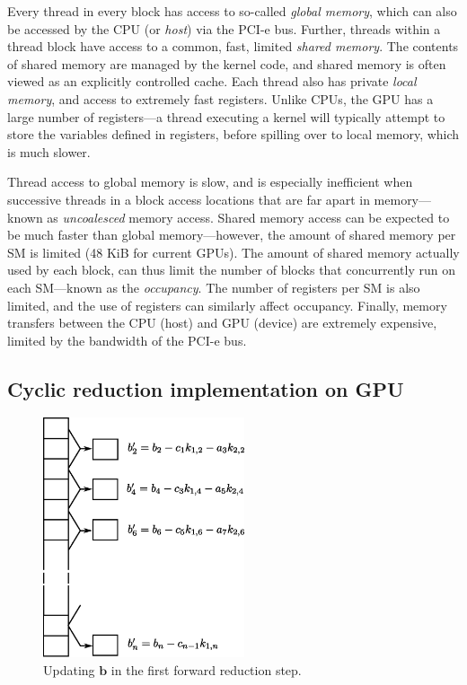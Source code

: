 \documentclass{elsarticle}
\begin{document}
Every thread in every block has access to so-called \emph{global memory},
which can also be accessed by the CPU (or \emph{host}) via the PCI-e bus.
Further,
threads within a thread block have access
to a common, fast, limited \emph{shared memory}.
The contents of shared memory are managed by the kernel code,
and shared memory is often viewed as an explicitly controlled cache.
Each thread also has private \emph{local memory},
and access to extremely fast registers.
Unlike CPUs, the GPU has a large number of registers---a
thread executing a kernel will
typically attempt to store the variables defined in registers,
before spilling over to local memory, which is much slower.

Thread access to global memory is slow,
and is especially inefficient when
successive threads in a block
access locations that are far apart in memory---known
as \emph{uncoalesced} memory access.
Shared memory access can be expected to be
much faster than global memory---however,
the amount of shared memory per SM is limited
(48 KiB for current GPUs).
The amount of shared memory actually used by each block,
can thus limit the number of blocks that
concurrently run on each SM---known as the \emph{occupancy}.
The number of registers per SM is also limited,
and the use of registers can similarly affect occupancy.
Finally, memory transfers between the CPU (host) and GPU (device)
are extremely expensive, limited by the bandwidth of the PCI-e bus.

\subsection{Cyclic reduction implementation on GPU}

\begin{figure}[h!]
\begin{center}
\includegraphics[height=200pt]{img/forward-reduction-step.eps}
\end{center}
\caption{Updating $\bm{b}$ in the first forward reduction step.}
\label{fig:forward-reduction-step}
\end{figure}
\end{document}
